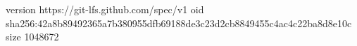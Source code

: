 version https://git-lfs.github.com/spec/v1
oid sha256:42a8b89492365a7b380955dfb69188de3c23d2cb8849455c4ac4c22ba8d8e10c
size 1048672
